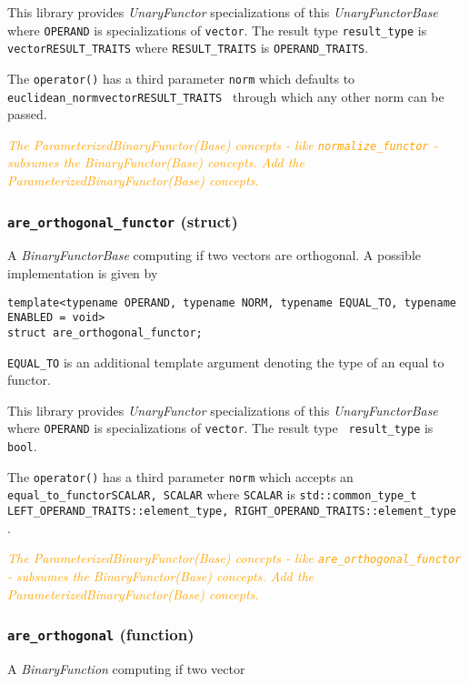 \documentclass[oneside]{book}
\begin{document}
This library provides \textit{UnaryFunctor} specializations of this \textit{UnaryFunctorBase} where
\texttt{OPERAND} is specializations of \texttt{vector}. The result type \texttt{result\_type}    is
\texttt{vector\textlangle RESULT\_TRAITS\textrangle} where \texttt{RESULT\_TRAITS}               is
\texttt{OPERAND\_TRAITS}.\newline

The \texttt{operator()} has a third parameter  \texttt{norm} which defaults to
\texttt{euclidean\_norm\textlangle vector\textlangle RESULT\_TRAITS\textrangle
\textrangle} through which any other norm can be passed.\newline

\textit{\textcolor{orange}{The \textit{ParameterizedBinaryFunctor(Base)} concepts - like
\texttt{normalize\_functor}       - subsumes the \textit{BinaryFunctor(Base)}  concepts.
Add the \textit{ParameterizedBinaryFunctor(Base) concepts.}}}

\subsubsection{\texttt{are\_orthogonal\_functor} (struct)}
A \textit{BinaryFunctorBase} computing if two vectors are orthogonal.
A possible implementation is given by
\begin{verbatim}
template<typename OPERAND, typename NORM, typename EQUAL_TO, typename ENABLED = void>
struct are_orthogonal_functor;
\end{verbatim}
\texttt{EQUAL\_TO} is an additional template argument denoting the type of an equal to functor.\newline

This library provides \textit{UnaryFunctor} specializations of this \textit{UnaryFunctorBase}
where \texttt{OPERAND} is specializations of \texttt{vector}. The result type        \texttt{
result\_type} is \texttt{bool}.\newline

The \texttt{operator()} has a third parameter \texttt{norm}   which accepts an
\texttt{equal\_to\_functor\textlangle SCALAR, SCALAR\textrangle}         where
\texttt{SCALAR} is \texttt{std::common\_type\_t                    \textlangle
LEFT\_OPERAND\_TRAITS::element\_type,    RIGHT\_OPERAND\_TRAITS::element\_type
\textrangle}.\newline

\textit{\textcolor{orange}{The \textit{ParameterizedBinaryFunctor(Base)} concepts - like
\texttt{are\_orthogonal\_functor} - subsumes the \textit{BinaryFunctor(Base)}  concepts.
Add the \textit{ParameterizedBinaryFunctor(Base) concepts.}}}

\subsubsection{\texttt{are\_orthogonal} (function)}
A \textit{BinaryFunction} computing if two vector


\end{document}
